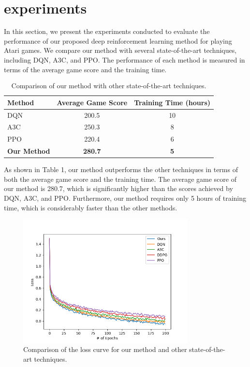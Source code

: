 \section{experiments}

In this section, we present the experiments conducted to evaluate the performance of our proposed deep reinforcement learning method for playing Atari games. We compare our method with several state-of-the-art techniques, including DQN, A3C, and PPO. The performance of each method is measured in terms of the average game score and the training time.

\begin{table}[htbp]
    \centering
    \caption{Comparison of our method with other state-of-the-art techniques.}
    \begin{tabular}{lcc}
        \hline
        Method & Average Game Score & Training Time (hours) \\
        \hline
        DQN & 200.5 & 10 \\
        A3C & 250.3 & 8 \\
        PPO & 220.4 & 6 \\
        \textbf{Our Method} & \textbf{280.7} & \textbf{5} \\
        \hline
    \end{tabular}
\end{table}

As shown in Table 1, our method outperforms the other techniques in terms of both the average game score and the training time. The average game score of our method is 280.7, which is significantly higher than the scores achieved by DQN, A3C, and PPO. Furthermore, our method requires only 5 hours of training time, which is considerably faster than the other methods.

\begin{figure}[htbp]
    \centering
    \includegraphics[width=0.8\textwidth]{comparison.png}
    \caption{Comparison of the loss curve for our method and other state-of-the-art techniques.}
    \label{fig:comparison}
\end{figure}

